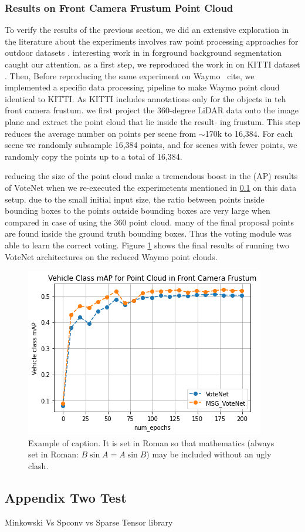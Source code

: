 \documentclass[10pt,twocolumn,letterpaper]{article}
\begin{document}
\subsubsection{Results on Front Camera Frustum Point Cloud}
To verify the results of the previous section, we did an extensive exploration in the literature about the experiments involves raw point processing approaches \cite{pointnet, point++, votennet, votenet frustutm, point rcnn} for outdoor datasets \cite{KITTI,  nuscenes, Waymo, a2d2}. interesting work in \cite{point rcnn} in forground background segmentation caught our attention. as a first step, we reproduced the work in \cite{point RCNN} on KITTI dataset \cite{KITTI}. Then, Before reproducing the same experiment on Waymo \ cite{}, we implemented a specific data processing pipeline to make Waymo point cloud identical to KITTI. As KITTI includes annotations only for the objects in teh front camera frustum. we first project the 360-degree LiDAR data onto the image plane and extract the point cloud that lie inside the result- ing frustum. This step reduces the average number on points per scene from $\sim$170k to 16,384. For each scene we randomly subsample 16,384 points, and for scenes with fewer points, we randomly copy the points up to a total of 16,384.

reducing the size of the point cloud make a tremendous boost in the (AP) results of VoteNet when we re-executed the experimetents mentioned in \ref{} on this data setup. due to the small initial input size, the ratio between points inside bounding boxes to the points outside bounding boxes are very large when compared in case of using the 360 point cloud. many of the final proposal points are found inside the ground truth bounding boxes. Thus the voting module was able to learn the correct voting. Figure \ref{fig:votnet_front_camera_results} shows the final results of running two VoteNet architectures on the reduced Waymo point clouds.

\begin{figure}
	\includegraphics[width=\linewidth]{media/votenet_mAP.png}
   \caption{Example of caption.  It is set in Roman so that mathematics
   (always set in Roman: $B \sin A = A \sin B$) may be included without an
   ugly clash.}
\label{fig:votnet_front_camera_results}
\end{figure}


\subsection{Appendix Two Test}

Minkowski Vs Spconv vs Sparse Tensor library
\end{document}
